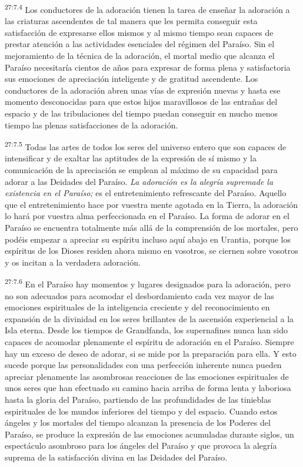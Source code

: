 \par
\textsuperscript{27:7.4} Los conductores de la adoración tienen la tarea de enseñar la adoración a las criaturas ascendentes de tal manera que les permita conseguir esta satisfacción de expresarse ellos mismos y al mismo tiempo sean capaces de prestar atención a las actividades esenciales del régimen del Paraíso. Sin el mejoramiento de la técnica de la adoración, el mortal medio que alcanza el Paraíso necesitaría cientos de años para expresar de forma plena y satisfactoria sus emociones de apreciación inteligente y de gratitud ascendente. Los conductores de la adoración abren unas vías de expresión nuevas y hasta ese momento desconocidas para que estos hijos maravillosos de las entrañas del espacio y de las tribulaciones del tiempo puedan conseguir en mucho menos tiempo las plenas satisfacciones de la adoración.

\par
\textsuperscript{27:7.5} Todas las artes de todos los seres del universo entero que son capaces de intensificar y de exaltar las aptitudes de la expresión de sí mismo y la comunicación de la apreciación se emplean al máximo de su capacidad para adorar a las Deidades del Paraíso. \textit{La adoración es la alegría supremade la existencia en el Paraíso;} es el entretenimiento refrescante del Paraíso. Aquello que el entretenimiento hace por vuestra mente agotada en la Tierra, la adoración lo hará por vuestra alma perfeccionada en el Paraíso. La forma de adorar en el Paraíso se encuentra totalmente más allá de la comprensión de los mortales, pero podéis empezar a apreciar su espíritu incluso aquí abajo en Urantia, porque los espíritus de los Dioses residen ahora mismo en vosotros, se ciernen sobre vosotros y os incitan a la verdadera adoración.

\par
\textsuperscript{27:7.6} En el Paraíso hay momentos y lugares designados para la adoración, pero no son adecuados para acomodar el desbordamiento cada vez mayor de las emociones espirituales de la inteligencia creciente y del reconocimiento en expansión de la divinidad en los seres brillantes de la ascensión experiencial a la Isla eterna. Desde los tiempos de Grandfanda, los supernafines nunca han sido capaces de acomodar plenamente el espíritu de adoración en el Paraíso. Siempre hay un exceso de deseo de adorar, si se mide por la preparación para ella. Y esto sucede porque las personalidades con una perfección inherente nunca pueden apreciar plenamente las asombrosas reacciones de las emociones espirituales de unos seres que han efectuado su camino hacia arriba de forma lenta y laboriosa hasta la gloria del Paraíso, partiendo de las profundidades de las tinieblas espirituales de los mundos inferiores del tiempo y del espacio. Cuando estos ángeles y los mortales del tiempo alcanzan la presencia de los Poderes del Paraíso, se produce la expresión de las emociones acumuladas durante siglos, un espectáculo asombroso para los ángeles del Paraíso y que provoca la alegría suprema de la satisfacción divina en las Deidades del Paraíso.

